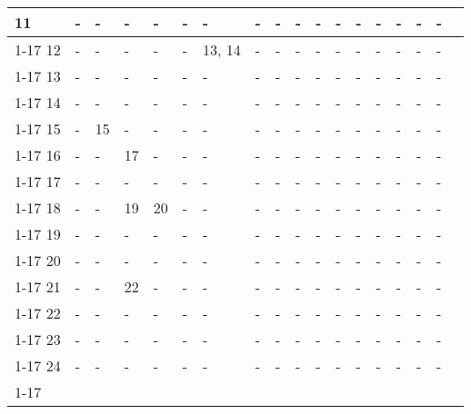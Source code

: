 \documentclass[12pt]{article}
\begin{document}
{\begin{table}[H]
\begin{tabular}{|l|l|l|l|l|l|l|l|l|l|l|l|l|l|l|l|l|l}
    11    & -     & -     & -  & -           & -              & -                & -   & -   & -  & -  & - & - & -  & - & - & -   &  \\ \cline{1-17}
    12    & -     & -     & -  & -           & -              & 13, 14           & -   & -   & -  & -  & - & - & -  & - & - & -   &  \\ \cline{1-17}
    13    & -     & -     & -  & -           & -              & -                & -   & -   & -  & -  & - & - & -  & - & - & -   &  \\ \cline{1-17}
    14    & -     & -     & -  & -           & -              & -                & -   & -   & -  & -  & - & - & -  & - & - & -   &  \\ \cline{1-17}
    15    & -     & 15    & -  & -           & -              & -                & -   & -   & -  & -  & - & - & -  & - & - & -   &  \\ \cline{1-17}
    16    & -     & -     & 17 & -           & -              & -                & -   & -   & -  & -  & - & - & -  & - & - & -   &  \\ \cline{1-17}
    17    & -     & -     & -  & -           & -              & -                & -   & -   & -  & -  & - & - & -  & - & - & -   &  \\ \cline{1-17}
    18    & -     & -     & 19 & 20          & -              & -                & -   & -   & -  & -  & - & - & -  & - & - & -   &  \\ \cline{1-17}
    19    & -     & -     & -  & -           & -              & -                & -   & -   & -  & -  & - & - & -  & - & - & -   &  \\ \cline{1-17}
    20    & -     & -     & -  & -           & -              & -                & -   & -   & -  & -  & - & - & -  & - & - & -   &  \\ \cline{1-17}
    21    & -     & -     & 22 & -           & -              & -                & -   & -   & -  & -  & - & - & -  & - & - & -   &  \\ \cline{1-17}
    22    & -     & -     & -  & -           & -              & -                & -   & -   & -  & -  & - & - & -  & - & - & -   &  \\ \cline{1-17}
    23    & -     & -     & -  & -           & -              & -                & -   & -   & -  & -  & - & - & -  & - & - & -   &  \\ \cline{1-17}
    24    & -     & -     & -  & -           & -              & -                & -   & -   & -  & -  & - & - & -  & - & - & -   &  \\ \cline{1-17}
    \end{tabular}
    \end{table}
    \newpage
}
\end{document}
